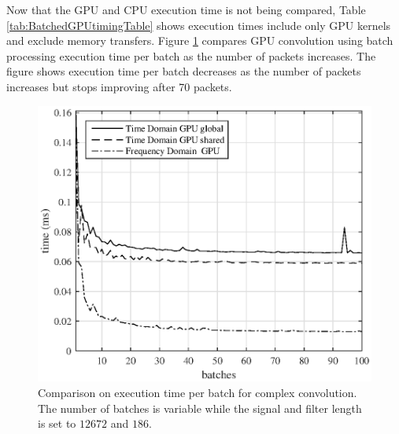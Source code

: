 Now that the GPU and CPU execution time is not being compared, Table \ref{tab:BatchedGPUtimingTable} shows execution times include only GPU kernels and exclude memory transfers.
Figure \ref{fig:CPUvsGPU_varyBatches_186taps_12672signal_timePerBatch} compares GPU convolution using batch processing execution time per batch as the number of packets increases.
The figure shows execution time per batch decreases as the number of packets increases but stops improving after 70 packets.
\begin{figure}
	\centering\includegraphics[width=5in]{figures/gpu_intro/CPUvsGPU_varyBatches_186taps_12672signal_timePerBatch.eps}
	\caption{Comparison on execution time per batch for complex convolution. The number of batches is variable while the signal and filter length is set to $12672$ and $186$.}
	\label{fig:CPUvsGPU_varyBatches_186taps_12672signal_timePerBatch}
\end{figure}


